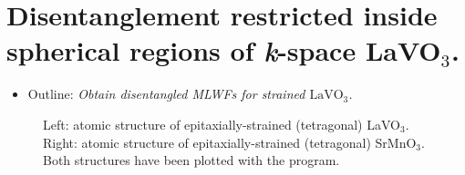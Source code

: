 \section{Disentanglement restricted inside spherical regions of \textit{k}-space LaVO$_3$.}
\label{sec20:LaVO3}

\begin{itemize}
	\item Outline: {\it Obtain disentangled MLWFs for strained $\mathrm{LaVO}_3$.}
\end{itemize}

\begin{figure}[h!]
\centering
{}
\centering
{}
\label{fig20}
\caption{Left: atomic structure of epitaxially-strained (tetragonal) LaVO$_3$. Right: atomic structure of epitaxially-strained (tetragonal) SrMnO$_3$. Both structures have been plotted with the \xcrysden{} program.}
\end{figure}
